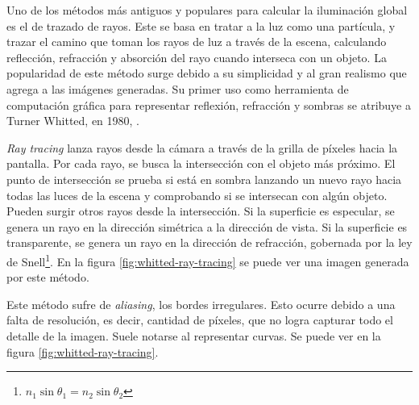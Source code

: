 Uno de los métodos más antiguos y populares para calcular la iluminación global es el de trazado de rayos.
Este se basa en tratar a la luz como una partícula, y trazar el camino que toman los rayos de luz a través de la escena, calculando reflección, refracción y absorción del rayo cuando interseca con un objeto.
La popularidad de este método surge debido a su simplicidad y al gran realismo que agrega a las imágenes generadas.
Su primer uso como herramienta de computación gráfica para representar reflexión, refracción y sombras se atribuye a Turner Whitted, en 1980, \cite{whitted-1980}.

\textit{Ray tracing} lanza rayos desde la cámara a través de la grilla de píxeles hacia la pantalla.
Por cada rayo, se busca la intersección con el objeto más próximo.
El punto de intersección se prueba si está en sombra lanzando un nuevo rayo hacia todas las luces de la escena y comprobando si se intersecan con algún objeto.
Pueden surgir otros rayos desde la intersección.
Si la superficie es especular, se genera un rayo en la dirección simétrica a la dirección de vista.
Si la superficie es transparente, se genera un rayo en la dirección de refracción, gobernada por la ley de Snell\footnote{$n_1 \sin{\theta_1} = n_2 \sin{\theta_2}$}.
En la figura \ref{fig:whitted-ray-tracing} se puede ver una imagen generada por este método.

Este método sufre de \textit{aliasing}, los bordes irregulares.
Esto ocurre debido a una falta de resolución, es decir, cantidad de píxeles, que no logra capturar todo el detalle de la imagen.
Suele notarse al representar curvas.
Se puede ver en la figura \ref{fig:whitted-ray-tracing}.


